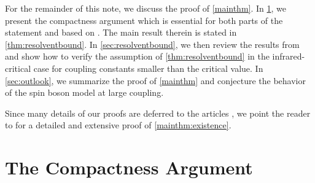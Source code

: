 \documentclass[a4paper,12pt,oneside]{article}
\begin{document}

For the remainder of this note, we discuss the proof of \cref{mainthm}. %
In \cref{sec:compact}, we present the compactness argument which is essential for both parts of the statement and based on \cite{HaslerHinrichsSiebert.2021a,HiroshimaMatte.2019}. The main result therein is stated in \cref{thm:resolventbound}. In \cref{sec:resolventbound}, we then review the results from \cite{HaslerHinrichsSiebert.2021b,HaslerHinrichsSiebert.2021c} and show how to verify the assumption of \cref{thm:resolventbound} in the infrared-critical case for coupling constants smaller than the critical value.
In \cref{sec:outlook}, we summarize the proof of \cref{mainthm} and conjecture the behavior of the spin boson model at large coupling.

Since many details of our proofs are deferred to the articles \cite{HaslerHinrichsSiebert.2021a,HaslerHinrichsSiebert.2021b,HaslerHinrichsSiebert.2021c}, we point the reader to \cite{Hinrichs.2022} for a detailed and extensive proof of \cref{mainthm:existence}.

\section{The Compactness Argument}\label{sec:compact}
\end{document}

